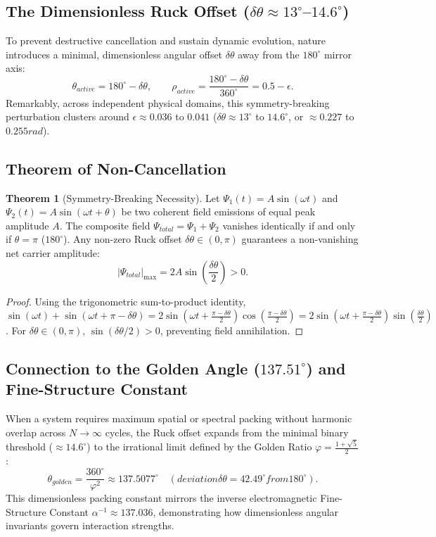 \documentclass[11pt,a4paper,oneside]{article}
\def\text#1{#1}%
\theoremstyle{definition}
\newtheorem{theorem}{Theorem}[section]
\begin{document}
\subsection{The Dimensionless Ruck Offset ($\delta \theta \approx 13^\circ$–$14.6^\circ$)}
To prevent destructive cancellation and sustain dynamic evolution, nature introduces a minimal, dimensionless angular offset $\delta \theta$ away from the $180^\circ$ mirror axis:
\begin{equation}
\theta_{\text{active}} = 180^\circ - \delta \theta, \qquad \rho_{\text{active}} = \frac{180^\circ - \delta \theta}{360^\circ} = 0.5 - \epsilon.
\end{equation}
Remarkably, across independent physical domains, this symmetry-breaking perturbation clusters around $\epsilon \approx 0.036$ to $0.041$ ($\delta \theta \approx 13^\circ$ to $14.6^\circ$, or $\approx 0.227$ to $0.255\text{ rad}$).
\subsection{Theorem of Non-Cancellation}
\begin{theorem}[Symmetry-Breaking Necessity]
Let $\Psi_1(t) = A \sin(\omega t)$ and $\Psi_2(t) = A \sin(\omega t + \theta)$ be two coherent field emissions of equal peak amplitude $A$. The composite field $\Psi_{\text{total}} = \Psi_1 + \Psi_2$ vanishes identically if and only if $\theta = \pi$ ($180^\circ$). Any non-zero Ruck offset $\delta \theta \in (0, \pi)$ guarantees a non-vanishing net carrier amplitude:
\begin{equation}
|\Psi_{\text{total}}|_{\max} = 2A \sin\left(\frac{\delta \theta}{2}\right) > 0.
\end{equation}
\end{theorem}
\begin{proof}
Using the trigonometric sum-to-product identity, $\sin(\omega t) + \sin(\omega t + \pi - \delta \theta) = 2 \sin(\omega t + \frac{\pi - \delta \theta}{2}) \cos(\frac{\pi - \delta \theta}{2}) = 2 \sin(\omega t + \frac{\pi - \delta \theta}{2}) \sin(\frac{\delta \theta}{2})$. For $\delta \theta \in (0, \pi)$, $\sin(\delta \theta / 2) > 0$, preventing field annihilation.
\end{proof}
\subsection{Connection to the Golden Angle ($137.51^\circ$) and Fine-Structure Constant}
When a system requires maximum spatial or spectral packing without harmonic overlap across $N \to \infty$ cycles, the Ruck offset expands from the minimal binary threshold ($\approx 14.6^\circ$) to the irrational limit defined by the Golden Ratio $\varphi = \frac{1 + \sqrt{5}}{2}$:
\begin{equation}
\theta_{\text{golden}} = \frac{360^\circ}{\varphi^2} \approx 137.5077^\circ \quad (\text{deviation } \delta \theta = 42.49^\circ \text{ from } 180^\circ).
\end{equation}
This dimensionless packing constant mirrors the inverse electromagnetic Fine-Structure Constant $\alpha^{-1} \approx 137.036$, demonstrating how dimensionless angular invariants govern interaction strengths.
\end{document}
